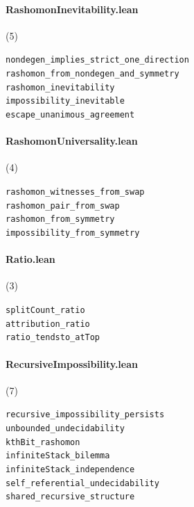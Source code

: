 \paragraph{RashomonInevitability.lean} (5)

{\footnotesize
\texttt{nondegen\_implies\_strict\_one\_direction}\\
\texttt{rashomon\_from\_nondegen\_and\_symmetry}\\
\texttt{rashomon\_inevitability}\\
\texttt{impossibility\_inevitable}\\
\texttt{escape\_unanimous\_agreement}\\
}

\paragraph{RashomonUniversality.lean} (4)

{\footnotesize
\texttt{rashomon\_witnesses\_from\_swap}\\
\texttt{rashomon\_pair\_from\_swap}\\
\texttt{rashomon\_from\_symmetry}\\
\texttt{impossibility\_from\_symmetry}\\
}

\paragraph{Ratio.lean} (3)

{\footnotesize
\texttt{splitCount\_ratio}\\
\texttt{attribution\_ratio}\\
\texttt{ratio\_tendsto\_atTop}\\
}

\paragraph{RecursiveImpossibility.lean} (7)

{\footnotesize
\texttt{recursive\_impossibility\_persists}\\
\texttt{unbounded\_undecidability}\\
\texttt{kthBit\_rashomon}\\
\texttt{infiniteStack\_bilemma}\\
\texttt{infiniteStack\_independence}\\
\texttt{self\_referential\_undecidability}\\
\texttt{shared\_recursive\_structure}\\
}

